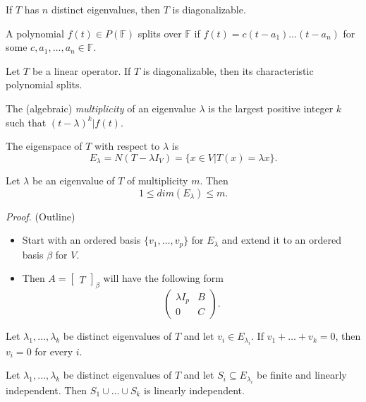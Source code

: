 \documentclass[12pt]{article}
\newenvironment{lemma}[2][Lemma]{\begin{trivlist}
\item[\hskip \labelsep {\bfseries #1}\hskip \labelsep {\bfseries #2.}]}{\end{trivlist}}
\newenvironment{theorem}[2][Theorem]{\begin{trivlist}
\item[\hskip \labelsep {\bfseries #1}\hskip \labelsep {\bfseries #2.}]}{\end{trivlist}}
\newenvironment{corollary}[2][Corollary]{\begin{trivlist}
\item[\hskip \labelsep {\bfseries #1}\hskip \labelsep {\bfseries #2}]}{\end{trivlist}}
\newenvironment{definition}[2][Definition]{\begin{trivlist}
\item[\hskip \labelsep {\bfseries #1}\hskip \labelsep {\bfseries #2}]}{\end{trivlist}}
\begin{document}
\begin{corollary}{6}
If $T$ has $n$ distinct eigenvalues, then $T$ is diagonalizable.
\end{corollary}

\begin{definition}{4}
A polynomial $f(t) \in P(\mathbb{F})$ splits over $\mathbb{F}$ if $f(t) = c(t - a_1) \dots (t - a_n)$ for some $c, a_1, \dots, a_n \in \mathbb{F}$.
\end{definition}

\begin{theorem}{5.6}
Let $T$ be a linear operator. If $T$ is diagonalizable, then its characteristic polynomial splits.
\end{theorem}

\begin{definition}{5}
The (algebraic) \textit{multiplicity} of an eigenvalue $\lambda$ is the largest positive integer $k$ such that $(t - \lambda)^k | f(t)$.
\end{definition}

\noindent The eigenspace of $T$ with respect to $\lambda$ is $$E_\lambda = N(T - \lambda I_V) = \{x \in V | T(x) = \lambda x\}.$$

\begin{theorem}{5.7}
Let $\lambda$ be an eigenvalue of $T$ of multiplicity $m$. Then $$1 \leq dim(E_\lambda) \leq m.$$
\end{theorem}

\textit{Proof.} (Outline)
\begin{itemize}
    \item Start with an ordered basis $\{v_1, \dots, v_p\}$ for $E_\lambda$ and extend it to an ordered basis $\beta$ for $V$.
    
    \item Then $A = \begin{bmatrix} T \end{bmatrix}_\beta$ will have the following form $$\begin{pmatrix}
    \lambda I_p & B \\ 0 & C
    \end{pmatrix}.$$
\end{itemize}

\begin{lemma}{9}
Let $\lambda_1, \dots, \lambda_k$ be distinct eigenvalues of $T$ and let $v_i \in E_{\lambda_i}$. If $v_1 + \dots + v_k = 0$, then $v_i = 0$ for every $i$.
\end{lemma}

\begin{theorem}{5.8}
Let $\lambda_1, \dots, \lambda_k$ be distinct eigenvalues of $T$ and let $S_i \subseteq E_{\lambda_i}$ be finite and linearly independent. Then $S_1 \cup \dots \cup S_k$ is linearly independent.
\end{theorem}
\end{document}
